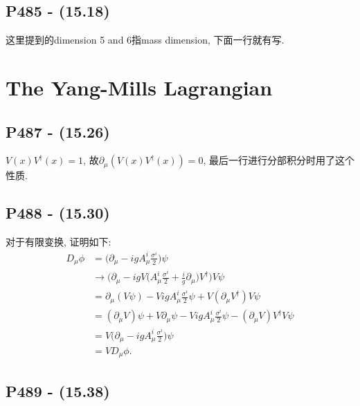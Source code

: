 \subsection{P485 - (15.18)}

这里提到的dimension 5 and 6指mass dimension, 下面一行就有写.

\section{The Yang-Mills Lagrangian}

\subsection{P487 - (15.26)}

$V(x)V^{\dagger}(x) = 1$, 故$\partial_{\mu}(V(x)V^{\dagger}(x))=0$, 最后一行进行分部积分时用了这个性质.

\subsection{P488 - (15.30)}

对于有限变换, 证明如下:
\begin{equation}
  \begin{aligned}
    D_{\mu}\phi & = \biggl(\partial_{\mu} - igA^{i}_{\mu}\frac{\sigma^i}{2}\biggr)\psi                                                                  \\
                & \rightarrow \biggl(\partial_{\mu} - igV\biggl(A^{i}_{\mu}\frac{\sigma^i}{2} + \frac{i}{g}\partial_{\mu}\biggr)V^{\dagger}\biggr)V\psi \\
                & = \partial_{\mu}(V\psi) - VigA^{i}_{\mu}\frac{\sigma^i}{2}\psi + V(\partial_{\mu}V^{\dagger})V\psi                                    \\
                & = (\partial_{\mu}V)\psi + V\partial_{\mu}\psi - VigA^{i}_{\mu}\frac{\sigma^i}{2}\psi - (\partial_{\mu}V)V^{\dagger}V\psi              \\
                & = V\biggl(\partial_{\mu} - igA^{i}_{\mu}\frac{\sigma^i}{2}\biggr)\psi                                                                 \\
                & = VD_{\mu}\phi.
  \end{aligned}
\end{equation}

\subsection{P489 - (15.38)}

